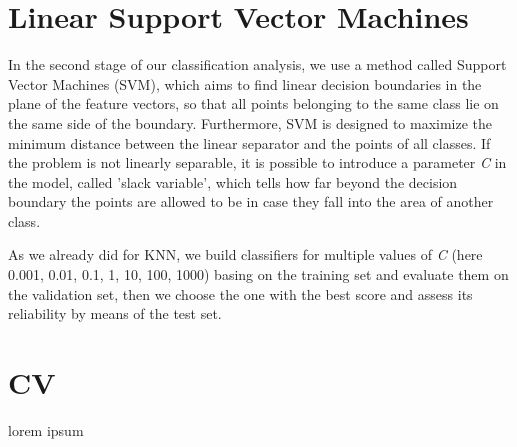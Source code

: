 \documentclass[11pt,twoside,a4paper]{article}
\begin{document}
\section{Linear Support Vector Machines}
In the second stage of our classification analysis, we use a method called Support Vector Machines (SVM), which aims to find linear decision boundaries in the plane of the feature vectors, so that all points belonging to the same class lie on the same side of the boundary. Furthermore, SVM is designed to maximize the minimum distance between the linear separator and the points of all classes.\newline
If the problem is not linearly separable, it is possible to introduce a parameter \emph{C} in the model, called 'slack variable', which tells how far beyond the decision boundary the points are allowed to be in case they fall into the area of another class.

As we already did for KNN, we build classifiers for multiple values of \emph{C} (here 0.001, 0.01, 0.1, 1, 10, 100, 1000) basing on the training set and evaluate them on the validation set, then we choose the one with the best score and assess its reliability by means of the test set.

\section{CV}
\label{CV}
lorem ipsum
\end{document}

